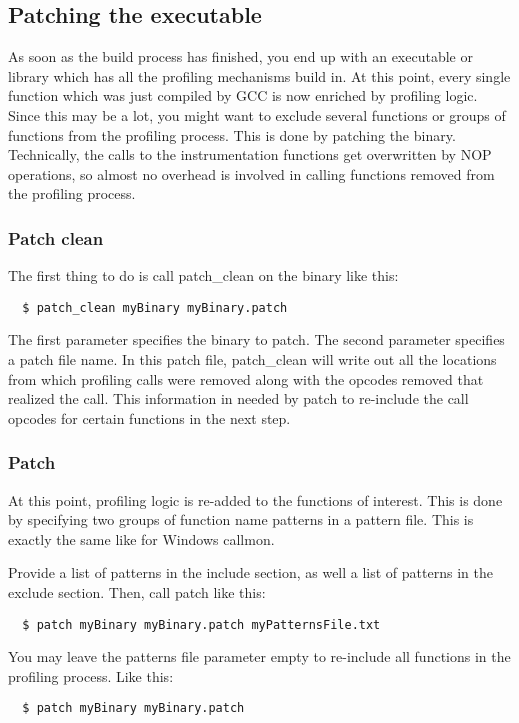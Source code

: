 \subsection{Patching the executable} As soon as the build process has finished, you end up with an executable or library which has all the profiling mechanisms build in. At this point, every single function which was just compiled by GCC is now enriched by profiling logic. Since this may be a lot, you might want to exclude several functions or groups of functions from the profiling process. This is done by patching the binary. Technically, the calls to the instrumentation functions get overwritten by NOP operations, so almost no overhead is involved in calling functions removed from the profiling process.

\subsubsection{Patch clean} The first thing to do is call patch\_clean on the binary like this:
\begin{verbatim}
  $ patch_clean myBinary myBinary.patch
\end{verbatim}
The first parameter specifies the binary to patch. The second parameter specifies a patch file name. In this patch file, patch\_clean will write out all the locations from which profiling calls were removed along with the opcodes removed that realized the call. This information in needed by patch to re-include the call opcodes for certain functions in the next step.

\subsubsection{Patch} At this point, profiling logic is re-added to the functions of interest. This is done by specifying two groups of function name patterns in a pattern file. This is exactly the same like for Windows callmon.

Provide a list of patterns in the include section, as well a list of patterns in the exclude section. Then, call patch like this:
\begin{verbatim}
  $ patch myBinary myBinary.patch myPatternsFile.txt
\end{verbatim}
You may leave the patterns file parameter empty to re-include all functions in the profiling process. Like this:
\begin{verbatim}
  $ patch myBinary myBinary.patch
\end{verbatim}

